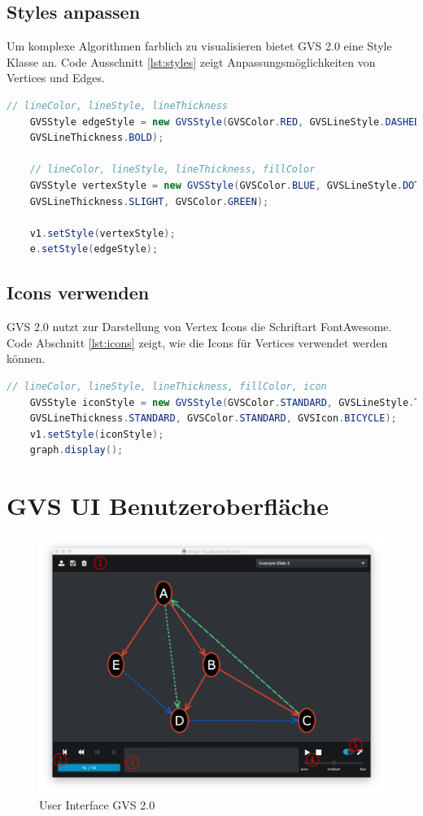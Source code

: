 \documentclass[11pt,a4paper,english,oneside]{book}
\numberwithin{equation}{chapter}
\begin{document}
	\clearpage
	
	\subsection{Styles anpassen}
	Um komplexe Algorithmen farblich zu visualisieren bietet GVS 2.0 eine Style Klasse an. Code Ausschnitt  \ref{lst:styles} zeigt Anpassungsmöglichkeiten von Vertices und Edges.
	
	\begin{lstlisting}[language=java, frame=single, caption={Styles verändern}, label={lst:styles}]
	// lineColor, lineStyle, lineThickness
	GVSStyle edgeStyle = new GVSStyle(GVSColor.RED, GVSLineStyle.DASHED,
	GVSLineThickness.BOLD);
	
	// lineColor, lineStyle, lineThickness, fillColor
	GVSStyle vertexStyle = new GVSStyle(GVSColor.BLUE, GVSLineStyle.DOTTED,
	GVSLineThickness.SLIGHT, GVSColor.GREEN);
	
	v1.setStyle(vertexStyle);
	e.setStyle(edgeStyle);
	\end{lstlisting}
	
	\subsection{Icons verwenden}
	GVS 2.0 nutzt zur Darstellung von Vertex Icons die Schriftart FontAwesome. Code Abschnitt \ref{lst:icons} zeigt, wie die Icons für Vertices verwendet werden können.
	
	\begin{lstlisting}[language=java, frame=single, caption={Icons benutzen}, label={lst:icons}]
	// lineColor, lineStyle, lineThickness, fillColor, icon
	GVSStyle iconStyle = new GVSStyle(GVSColor.STANDARD, GVSLineStyle.THROUGH,
	GVSLineThickness.STANDARD, GVSColor.STANDARD, GVSIcon.BICYCLE);
	v1.setStyle(iconStyle);
	graph.display();
	\end{lstlisting}	
	
	\clearpage
	
	\section{GVS UI Benutzeroberfläche}
		\begin{figure}[h!]
		\centering
		\includegraphics[width=0.7\linewidth]{assets/images/gvs-ui-graph}
		\caption{User Interface GVS 2.0}
		\label{fig:gvs-ui-graph}
	\end{figure}
\end{document}
